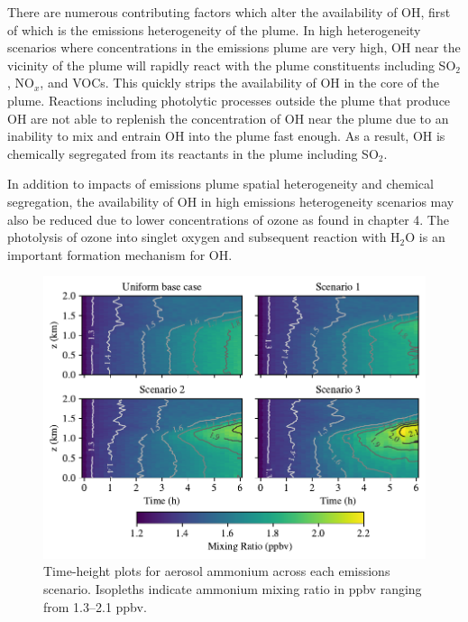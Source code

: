 There are numerous contributing factors which alter the availability of OH, first of which is the emissions heterogeneity of the plume. In high heterogeneity scenarios where concentrations in the emissions plume are very high, OH near the vicinity of the plume will rapidly react with the plume constituents including SO$_2$, NO$_x$, and VOCs. This quickly strips the availability of OH in the core of the plume. Reactions including photolytic processes outside the plume that produce OH are not able to replenish the concentration of OH near the plume due to an inability to mix and entrain OH into the plume fast enough. As a result, OH is chemically segregated from its reactants in the plume including SO$_2$. 

In addition to impacts of emissions plume spatial heterogeneity and chemical segregation, the availability of OH in high emissions heterogeneity scenarios may also be reduced due to lower concentrations of ozone as found in chapter 4. The photolysis of ozone into singlet oxygen and subsequent reaction with H$_2$O is an important formation mechanism for OH. 


\begin{figure}[!t]
  \centering
    \includegraphics[width=\textwidth]{figures/chapter5/height-time-pmc_NH4-four-scenarios.pdf}
    \caption{Time-height plots for aerosol ammonium across each emissions scenario. Isopleths indicate ammonium mixing ratio in ppbv ranging from 1.3--2.1 ppbv.}
    \label{fig:ht-nh4}
\end{figure}

